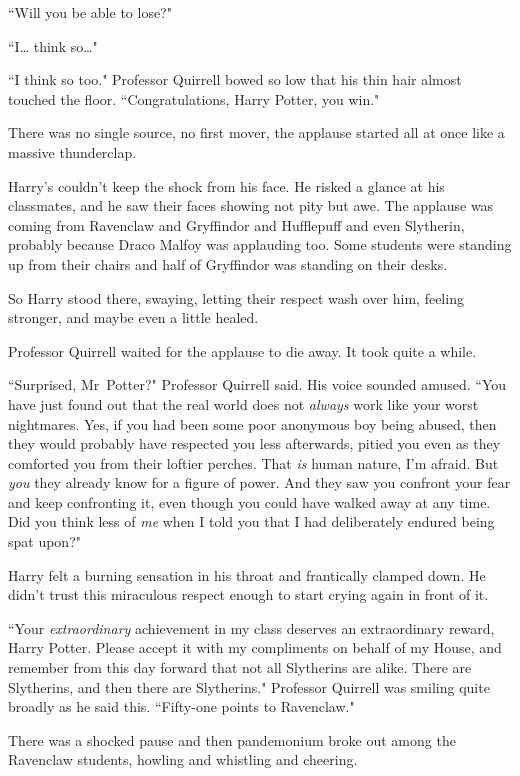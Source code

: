 ``Will you be able to lose?"

``I{\ldots} think so{\ldots}"

``I think so too." Professor Quirrell bowed so low that his thin hair almost touched the floor. ``Congratulations, Harry Potter, you win."

There was no single source, no first mover, the applause started all at once like a massive thunderclap.

Harry's couldn't keep the shock from his face. He risked a glance at his classmates, and he saw their faces showing not pity but awe. The applause was coming from Ravenclaw and Gryffindor and Hufflepuff and even Slytherin, probably because Draco Malfoy was applauding too. Some students were standing up from their chairs and half of Gryffindor was standing on their desks.

So Harry stood there, swaying, letting their respect wash over him, feeling stronger, and maybe even a little healed.

Professor Quirrell waited for the applause to die away. It took quite a while.

``Surprised, Mr~Potter?" Professor Quirrell said. His voice sounded amused. ``You have just found out that the real world does not \emph{always} work like your worst nightmares. Yes, if you had been some poor anonymous boy being abused, then they would probably have respected you less afterwards, pitied you even as they comforted you from their loftier perches. That \emph{is} human nature, I'm afraid. But \emph{you} they already know for a figure of power. And they saw you confront your fear and keep confronting it, even though you could have walked away at any time. Did you think less of \emph{me} when I told you that I had deliberately endured being spat upon?"

Harry felt a burning sensation in his throat and frantically clamped down. He didn't trust this miraculous respect enough to start crying again in front of it.

``Your \emph{extraordinary} achievement in my class deserves an extraordinary reward, Harry Potter. Please accept it with my compliments on behalf of my House, and remember from this day forward that not all Slytherins are alike. There are Slytherins, and then there are Slytherins." Professor Quirrell was smiling quite broadly as he said this. ``Fifty-one points to Ravenclaw."

There was a shocked pause and then pandemonium broke out among the Ravenclaw students, howling and whistling and cheering.

